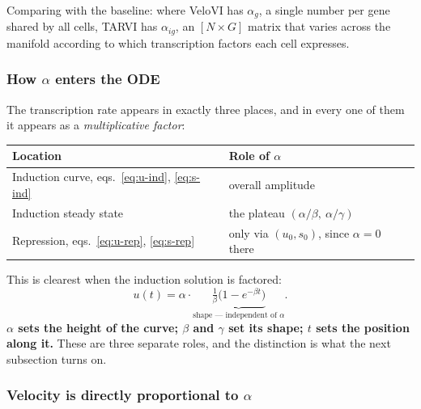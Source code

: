 \documentclass[11pt,a4paper]{article}
\newcommand{\uns}{u}
\newcommand{\spl}{s}
\theoremstyle{definition}
\begin{document}
Comparing with the baseline: where VeloVI has $\alpha_g$, a single number per
gene shared by all cells, TARVI has $\alpha_{ig}$, an $[N \times G]$ matrix
that varies across the manifold according to which transcription factors each
cell expresses.

\subsubsection{How \texorpdfstring{$\alpha$}{alpha} enters the ODE}
\label{sec:alpha-in-ode}

The transcription rate appears in exactly three places, and in every one of
them it appears as a \emph{multiplicative factor}:

\begin{center}
\begin{tabular}{@{}ll@{}}
\toprule
\textbf{Location} & \textbf{Role of $\alpha$} \\
\midrule
Induction curve, eqs.\ \eqref{eq:u-ind}, \eqref{eq:s-ind} & overall amplitude \\
Induction steady state & the plateau $(\alpha/\beta,\ \alpha/\gamma)$ \\
Repression, eqs.\ \eqref{eq:u-rep}, \eqref{eq:s-rep} & only via $(\uns_0, \spl_0)$, since $\alpha = 0$ there \\
\bottomrule
\end{tabular}
\end{center}

This is clearest when the induction solution is factored:
%
\begin{equation}
\uns(t) = \alpha \cdot \underbrace{\tfrac{1}{\beta}\big(1 - e^{-\beta t}\big)}_{\text{shape --- independent of }\alpha} .
\end{equation}
%
\textbf{$\alpha$ sets the height of the curve; $\beta$ and $\gamma$ set its
shape; $t$ sets the position along it.} These are three separate roles, and the
distinction is what the next subsection turns on.

\subsubsection{Velocity is directly proportional to \texorpdfstring{$\alpha$}{alpha}}
\end{document}
